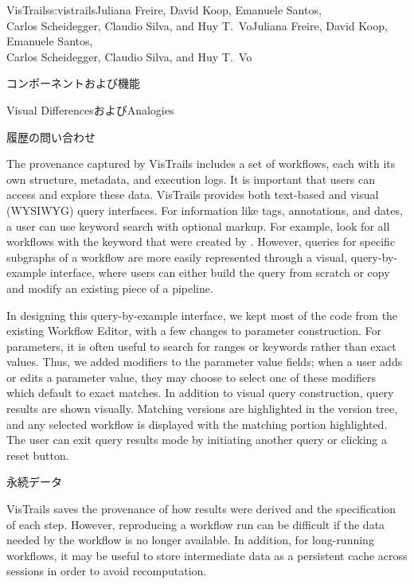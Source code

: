 \begin{aosachaptertoc}{VisTrails}{s:vistrails}{Juliana Freire, David Koop, Emanuele Santos, \\ Carlos Scheidegger, Claudio Silva, and Huy T.\ Vo}{Juliana Freire, David Koop, Emanuele Santos, \\ \hspace*{0.9cm} Carlos Scheidegger, Claudio Silva, and Huy T.\ Vo}
\begin{aosasect1}{コンポーネントおよび機能}
\begin{aosasect2}{Visual DifferencesおよびAnalogies}
\end{aosasect2}

\begin{aosasect2}{履歴の問い合わせ}

The provenance captured by VisTrails includes a set of workflows, each
with its own structure, 
metadata, and execution logs. It is important that users can access
and explore these data.  VisTrails provides both text-based and visual
(WYSIWYG) query interfaces.  For information like tags, annotations,
and dates, a user can use keyword search with optional markup. For
example, look for all workflows with the keyword  that were
created by .  However, queries for specific subgraphs of
a workflow are more easily represented through a visual, query-by-example interface, where users can
either build the query from scratch or copy and modify an existing
piece of a pipeline.

In designing this query-by-example interface, we kept most of the code
from the existing Workflow Editor, with a few changes to parameter
construction.  For parameters, it is often useful to search for ranges
or keywords rather than exact values.  Thus, we added modifiers to the
parameter value fields; when a user adds or edits a parameter value,
they may choose to select one of these modifiers which default to
exact matches.  In addition to visual query construction, query
results are shown visually.  Matching versions are highlighted in the
version tree, and any selected workflow is displayed with the matching
portion highlighted.  The user can exit query results mode by
initiating another query or clicking a reset button.

\end{aosasect2}

\begin{aosasect2}{永続データ}

VisTrails saves the provenance of how results were derived and the
specification of each step. However, reproducing a workflow run can be
difficult if the data needed by the workflow is no longer available.
In addition, for long-running workflows, it may be useful to store
intermediate data as a persistent cache across sessions in order to
avoid recomputation.


\end{aosasect2}
\end{aosasect1}
\end{aosachaptertoc}
